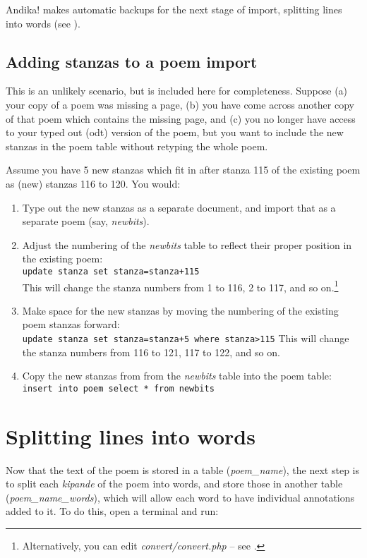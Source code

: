 Andika! makes automatic backups for the next stage of import, splitting lines into words (see ). 

\subsection{Adding stanzas to a poem import}
\label{ss:addstanzas}

This is an unlikely scenario, but is included here for completeness.  Suppose (a) your copy of a poem was missing a page, (b) you have come across another copy of that poem which contains the missing page, and (c) you no longer have access to your typed out (odt) version of the poem, but you want to include the new stanzas in the poem table without retyping the whole poem.  

Assume you have 5 new stanzas which fit in after stanza 115 of the existing poem as (new) stanzas 116 to 120.  You would:
\begin{enumerate}
\item Type out the new stanzas as a separate document, and import that as a separate poem (say, \textit{newbits}).
\item Adjust the numbering of the \textit{newbits} table to reflect their proper position in the existing poem:\\
\verb|update stanza set stanza=stanza+115|\\
This will change the stanza numbers from 1 to 116, 2 to 117, and so on.\footnote{Alternatively, you can edit \textit{convert/convert.php} -- see .}
\item Make space for the new stanzas by moving the numbering of the existing poem stanzas forward:\\
\verb|update stanza set stanza=stanza+5 where stanza>115|
This will change the stanza numbers from 116 to 121, 117 to 122, and so on.
\item Copy the new stanzas from from the \textit{newbits} table into the poem table:\\
\verb|insert into poem select * from newbits|
\end{enumerate}


\section{Splitting lines into words}
\label{s:splitlines}

Now that the text of the poem is stored in a table (\textit{poem_name}), the next step is to split each \textit{kipande} of the poem into words, and store those in another table (\textit{poem_name_words}), which will allow each word to have individual annotations added to it.  To do this, open a terminal and run:

